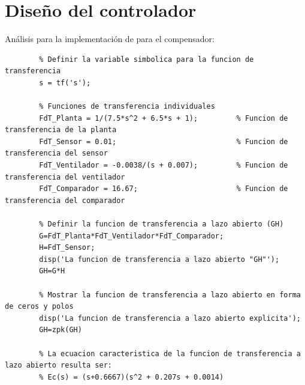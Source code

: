 \documentclass[12pt]{article}
\begin{document}
\section{Diseño del controlador}
	Análisis para la implementación de para el compensador:
	\begin{lstlisting}
		% Definir la variable simbolica para la funcion de transferencia
		s = tf('s');
		
		% Funciones de transferencia individuales
		FdT_Planta = 1/(7.5*s^2 + 6.5*s + 1);         % Funcion de transferencia de la planta
		FdT_Sensor = 0.01;                            % Funcion de transferencia del sensor
		FdT_Ventilador = -0.0038/(s + 0.007);         % Funcion de transferencia del ventilador
		FdT_Comparador = 16.67;                       % Funcion de transferencia del comparador
		
		% Definir la funcion de transferencia a lazo abierto (GH)
		G=FdT_Planta*FdT_Ventilador*FdT_Comparador;
		H=FdT_Sensor;
		disp('La funcion de transferencia a lazo abierto "GH"');
		GH=G*H
		
		% Mostrar la funcion de transferencia a lazo abierto en forma de ceros y polos
		disp('La funcion de transferencia a lazo abierto explicita');
		GH=zpk(GH)
		
		% La ecuacion caracteristica de la funcion de transferencia a lazo abierto resulta ser:
		% Ec(s) = (s+0.6667)(s^2 + 0.207s + 0.0014)
	\end{lstlisting}\newpage
	
\end{document}
